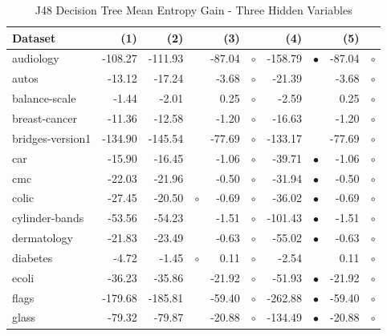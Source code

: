 \newpage
{\centering \footnotesize \begin{longtable}{lrr@{\hspace{0.1cm}}cr@{\hspace{0.1cm}}cr@{\hspace{0.1cm}}cr@{\hspace{0.1cm}}c}
\caption{\label{j48meg3}J48 Decision Tree Mean Entropy Gain - Three Hidden Variables}
\\
\hline
Dataset & (1)& (2) & & (3) & & (4) & & (5) & \\
\hline
audiology & -108.27 & -111.93 &           &  -87.04 &  $\circ$ & -158.79 & $\bullet$ &  -87.04 &  $\circ$\\
autos &  -13.12 &  -17.24 &           &   -3.68 &  $\circ$ &  -21.39 &           &   -3.68 &  $\circ$\\
balance-scale &   -1.44 &   -2.01 &           &    0.25 &  $\circ$ &   -2.59 &           &    0.25 &  $\circ$\\
breast-cancer &  -11.36 &  -12.58 &           &   -1.20 &  $\circ$ &  -16.63 &           &   -1.20 &  $\circ$\\
bridges-version1 & -134.90 & -145.54 &           &  -77.69 &  $\circ$ & -133.17 &           &  -77.69 &  $\circ$\\
car &  -15.90 &  -16.45 &           &   -1.06 &  $\circ$ &  -39.71 & $\bullet$ &   -1.06 &  $\circ$\\
cmc &  -22.03 &  -21.96 &           &   -0.50 &  $\circ$ &  -31.94 & $\bullet$ &   -0.50 &  $\circ$\\
colic &  -27.45 &  -20.50 &   $\circ$ &   -0.69 &  $\circ$ &  -36.02 & $\bullet$ &   -0.69 &  $\circ$\\
cylinder-bands &  -53.56 &  -54.23 &           &   -1.51 &  $\circ$ & -101.43 & $\bullet$ &   -1.51 &  $\circ$\\
dermatology &  -21.83 &  -23.49 &           &   -0.63 &  $\circ$ &  -55.02 & $\bullet$ &   -0.63 &  $\circ$\\
diabetes &   -4.72 &   -1.45 &   $\circ$ &    0.11 &  $\circ$ &   -2.54 &           &    0.11 &  $\circ$\\
ecoli &  -36.23 &  -35.86 &           &  -21.92 &  $\circ$ &  -51.93 & $\bullet$ &  -21.92 &  $\circ$\\
flags & -179.68 & -185.81 &           &  -59.40 &  $\circ$ & -262.88 & $\bullet$ &  -59.40 &  $\circ$\\
glass &  -79.32 &  -79.87 &           &  -20.88 &  $\circ$ & -134.49 & $\bullet$ &  -20.88 &  $\circ$\\

\end{longtable}}
